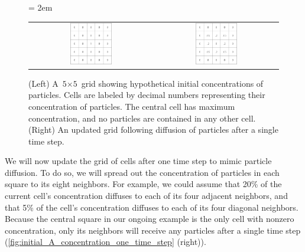 \begin{figure}[h]
\centering
\mySfFamily
\tabcolsep = 2em
\begin{tabular}{c c}
\includegraphics[width = 0.35\textwidth]{../images/initial_A_concentration.png} & \includegraphics[width = 0.35\textwidth]{../images/A_concentration_one_time_step.png}
\end{tabular}
\caption{(Left) A $\text{5} \times \text{5}$ grid showing hypothetical initial concentrations of  particles. Cells are labeled by decimal numbers representing their concentration of  particles. The central cell has maximum concentration, and no particles are contained in any other cell. (Right) An updated grid following diffusion of particles after a single time step.}
\label{fig:initial_A_concentration_one_time_step}
\end{figure}

We will now update the grid of cells after one time step to mimic particle diffusion. To do so, we will spread out the concentration of particles in each square to its eight neighbors. For example, we could assume that 20\% of the current cell's concentration diffuses to each of its four adjacent neighbors, and that 5\% of the cell's concentration diffuses to each of its four diagonal neighbors. Because the central square in our ongoing example is the only cell with nonzero concentration, only its neighbors will receive any particles after a single time step (\autoref{fig:initial_A_concentration_one_time_step} (right)).\\

\begin{note}\end{note}

